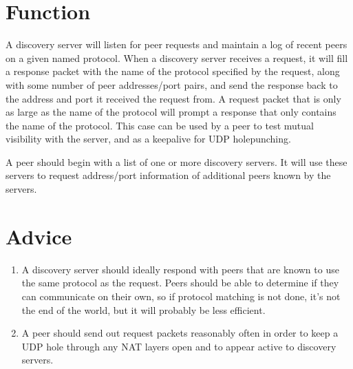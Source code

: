 \documentclass{article}
\begin{document}
\section{Function}

A discovery server will listen for peer requests and maintain a log of recent peers on a given named protocol.
When a discovery server receives a request, it will fill a response packet with the name of the protocol specified by the request, along with some number of peer addresses/port pairs, and send the response back to the address and port it received the request from. A request packet that is only as large as the name of the protocol will prompt a response that only contains the name of the protocol. This case can be used by a peer to test mutual visibility with the server, and as a keepalive for UDP holepunching.

A peer should begin with a list of one or more discovery servers. It will use these servers to request address/port information of additional peers known by the servers.

\section{Advice}

\begin{enumerate}
\item A discovery server should ideally respond with peers that are known to use the same protocol as the request. Peers should be able to determine if they can communicate on their own, so if protocol matching is not done, it's not the end of the world, but it will probably be less efficient.
\item A peer should send out request packets reasonably often in order to keep a UDP hole through any NAT layers open and to appear active to discovery servers.
\end{enumerate}
\end{document}
